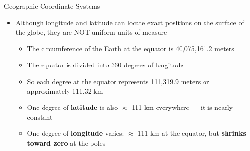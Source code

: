 \documentclass[dvipsnames,hyperref={pdfpagelabels=false}]{beamer}
\begin{document}
 
 
 
 
 
 
 
\begin{frame}{Geographic Coordinate Systems}
	\begin{itemize}
		
		\item Although longitude and latitude can locate exact positions on the surface of the globe, they are NOT uniform units of measure
		\vspace{0.2cm}
		\begin{itemize}
			\item The circumference of the Earth at the equator is 40,075,161.2 meters
			\vspace{0.2cm}
			\item The equator is divided into 360 degrees of longitude
			\vspace{0.2cm}
			\item So each degree at the equator represents 111,319.9 meters or approximately 111.32 km
			\vspace{0.2cm}
			\item One degree of \textbf{latitude} is also $\approx$ 111 km everywhere --- it is nearly constant
			\vspace{0.2cm}
			\item One degree of \textbf{longitude} varies: $\approx$ 111 km at the equator, but \textbf{shrinks toward zero} at the poles
		\end{itemize}
		
	\end{itemize}
\end{frame}
 
 
 
\end{document}
